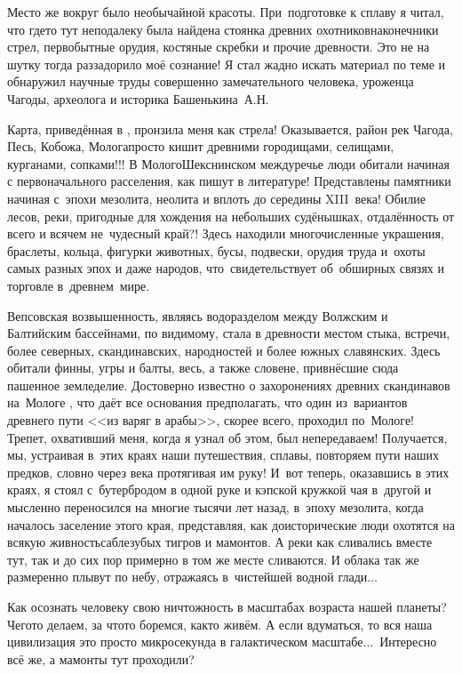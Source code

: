 Место же вокруг было необычайной красоты. При~подготовке к сплаву я читал, что где\sdash то тут неподалеку была найдена стоянка древних охотников\mdash наконечники стрел, первобытные орудия, костяные скребки и прочие древности. Это не на шутку тогда раззадорило моё сознание! Я стал жадно искать материал по теме и обнаружил научные труды совершенно замечательного человека, уроженца Чагоды, археолога и историка Башенькина~А.Н. 

Карта, приведённая в \cite{БашенькинМологоШекснинскоеМеждуречье}, пронзила меня как стрела! Оказывается, район рек Чагода, Песь, Кобожа, Молога\mdash просто кишит древними городищами, селищами, курганами, сопками!!! В Молого\sdash Шекснинском междуречье люди обитали начиная с первоначального расселения, как пишут в литературе! Представлены памятники начиная с~эпохи мезолита, неолита и вплоть до середины XIII~века! Обилие лесов, реки, пригодные для хождения на небольших судёнышках, отдалённость от всего и вся\mdash чем не~чудесный край?! Здесь находили многочисленные украшения, браслеты, кольца, фигурки животных, бусы, подвески, орудия труда и~охоты самых разных эпох и даже народов, что~свидетельствует об~обширных связях и торговле в~древнем~мире.

Вепсовская возвышенность, являясь водоразделом между Волжским и Балтийским бассейнами, по видимому, стала в древности местом стыка, встречи, более северных, скандинавских, народностей и более южных славянских. Здесь обитали финны, угры и балты, весь, а также словене, привнёсшие сюда пашенное земледелие. Достоверно известно о захоронениях древних скандинавов на~Мологе \cite{БашенькинМологоШекснинскоеМеждуречье}, что даёт все основания предполагать, что один из~вариантов древнего пути <<из варяг в арабы>>, скорее всего, проходил по~Мологе! Трепет, охвативший меня, когда я узнал об этом, был непередаваем! Получается, мы, устраивая в~этих краях наши путешествия, сплавы, повторяем пути наших предков, словно через века протягивая им руку!
\newpage
И~вот теперь, оказавшись в этих краях, я стоял с~бутербродом в одной руке и кэпской кружкой чая в~другой и мысленно переносился на многие тысячи лет назад, в~эпоху мезолита, когда началось заселение этого края, представляя, как доисторические люди охотятся на всякую живность\mdash саблезубых тигров и мамонтов. А реки как сливались вместе тут, так и до сих пор примерно в том же месте сливаются. И облака так же размеренно плывут по небу, отражаясь в~чистейшей водной глади$\ldots$

Как осознать человеку свою ничтожность в масштабах возраста нашей планеты? Чего\sdash то делаем, за что\sdash то боремся, как\sdash то живём. А если вдуматься, то вся наша цивилизация \mdash это просто микросекунда в галактическом масштабе$\ldots$~Интересно всё же, а мамонты тут проходили?

